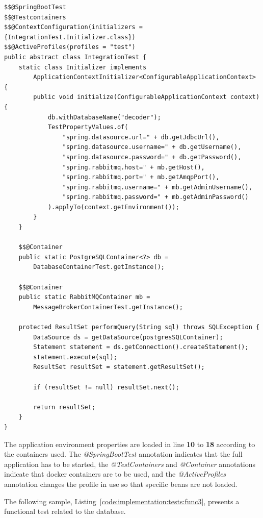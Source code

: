 \begin{lstlisting}[style=Java, caption=Functional Test - Foundation - \textbf{Data Decoder Master Backend} Setup, label={code:implementation:tests:func2}]
$$@SpringBootTest
$$@Testcontainers
$$@ContextConfiguration(initializers = {IntegrationTest.Initializer.class})
$$@ActiveProfiles(profiles = "test")
public abstract class IntegrationTest {
    static class Initializer implements 
        ApplicationContextInitializer<ConfigurableApplicationContext> {
        public void initialize(ConfigurableApplicationContext context) {
            db.withDatabaseName("decoder");
            TestPropertyValues.of(
                "spring.datasource.url=" + db.getJdbcUrl(),
                "spring.datasource.username=" + db.getUsername(),
                "spring.datasource.password=" + db.getPassword(),
                "spring.rabbitmq.host=" + mb.getHost(),
                "spring.rabbitmq.port=" + mb.getAmqpPort(),
                "spring.rabbitmq.username=" + mb.getAdminUsername(),
                "spring.rabbitmq.password=" + mb.getAdminPassword()
            ).applyTo(context.getEnvironment());
        }
    }

    $$@Container
    public static PostgreSQLContainer<?> db = 
        DatabaseContainerTest.getInstance();

    $$@Container
    public static RabbitMQContainer mb =
        MessageBrokerContainerTest.getInstance();

    protected ResultSet performQuery(String sql) throws SQLException {
        DataSource ds = getDataSource(postgresSQLContainer);
        Statement statement = ds.getConnection().createStatement();
        statement.execute(sql);
        ResultSet resultSet = statement.getResultSet();

        if (resultSet != null) resultSet.next();

        return resultSet;
    }
}
\end{lstlisting}

The application environment properties are loaded in line \textbf{10} to \textbf{18} according to the containers used. The \textit{@SpringBootTest} annotation indicates that the full application has to be started, the \textit{@TestContainers} and \textit{@Container} annotations indicate that docker containers are to be used, and the \textit{@ActiveProfiles} annotation changes the profile in use so that specific beans are not loaded.

The following sample, Listing~\ref{code:implementation:tests:func3}, presents a functional test related to the database.

